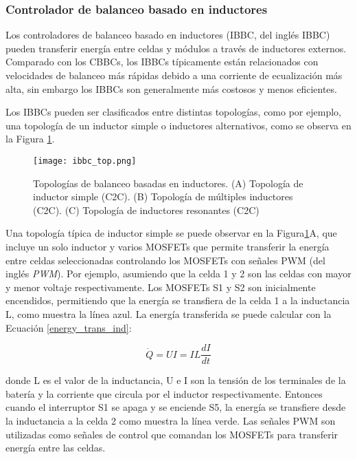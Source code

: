 \subsubsection{Controlador de balanceo basado en inductores}

Los controladores de balanceo basado en inductores (\acrshort{IBBC}, del
ingl\'es \acrlong{IBBC}) pueden transferir energ\'ia entre celdas y m\'odulos a
trav\'es de inductores externos. Comparado con los \acrshort{CBBC}s, los
\acrshort{IBBC}s t\'ipicamente est\'an relacionados con velocidades de balanceo
m\'as r\'apidas debido a una corriente de ecualizaci\'on m\'as alta, sin embargo
los \acrshort{IBBC}s son generalmente m\'as costosos y menos eficientes.

Los \acrshort{IBBC}s pueden ser clasificados entre distintas topolog\'ias, como 
por ejemplo, una topolog\'ia de un inductor simple o inductores alternativos, 
como se observa en la Figura \ref{ibbc_top}.

\begin{figure}[h!]
    \begin{center}
        \texttt{[image: ibbc\_top.png]}
        \caption{Topolog\'ias de balanceo basadas en inductores. (A) Topolog\'ia
        de inductor simple (\acrshort{C2C}). (B) Topolog\'ia de m\'ultiples
        inductores (\acrshort{C2C}). (C) Topolog\'ia de inductores resonantes
        (\acrshort{C2C})}
        \label{ibbc_top}
    \end{center}
\end{figure}

Una topolog\'ia t\'ipica de inductor simple se puede observar en la
Figura\ref{ibbc_top}A, que incluye un solo inductor y varios MOSFETs que permite
transferir la energ\'ia entre celdas seleccionadas controlando los MOSFETs con
señales \acrshort{PWM} (del ingl\'es \emph{\acrlong{PWM}}). Por ejemplo, 
asumiendo que la celda 1 y 2 son las celdas con mayor y menor voltaje 
respectivamente. Los MOSFETs S1 y S2 son inicialmente encendidos, permitiendo 
que la energ\'ia se transfiera de la celda 1 a la inductancia L, como muestra la 
línea azul. La energ\'ia transferida se puede calcular con la Ecuaci\'on 
\ref{energy_trans_ind}:

\begin{equation}
    \dot{Q} = UI = IL\frac{dI}{dt} \label{energy_trans_ind}
\end{equation}

donde L es el valor de la inductancia, U e I son la tensi\'on de los terminales
de la bater\'ia y la corriente que circula por el inductor respectivamente.
Entonces cuando el interruptor S1 se apaga y se enciende S5, la energ\'ia se
transfiere desde la inductancia a la celda 2 como muestra la línea verde.
Las señales \acrshort{PWM} son utilizadas como señales de control que comandan 
los MOSFETs para transferir energ\'ia entre las celdas.

